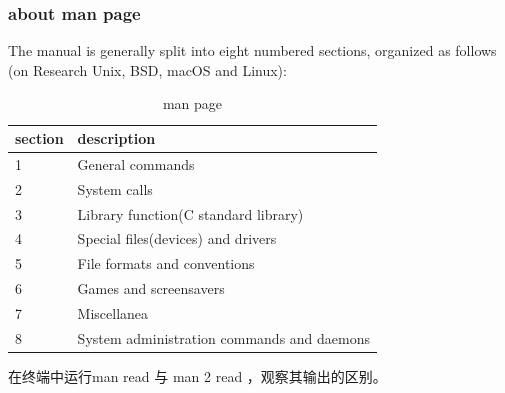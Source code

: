 \documentclass{beamer}
\begin{document}
\begin{frame}
\frametitle{about man page}
The manual is generally split into eight numbered sections, organized as follows (on Research Unix, BSD, macOS and Linux):
\begin{table}
\begin{tabular}{ll}
\toprule
\textbf{section} & \textbf{description} \\
\midrule
1 & General commands\\
 2 & System calls\\
 3& Library function(C standard library)\\
 4 & Special files(devices) and drivers\\
  5 & File formats and conventions\\
  6  & Games and screensavers\\
   7  & Miscellanea\\
   8   & System administration commands and daemons\\  
\bottomrule
\end{tabular}
\caption{man page}
\end{table}

在终端中运行man read 与 man 2 read ，观察其输出的区别。
\end{frame}
\end{document}

